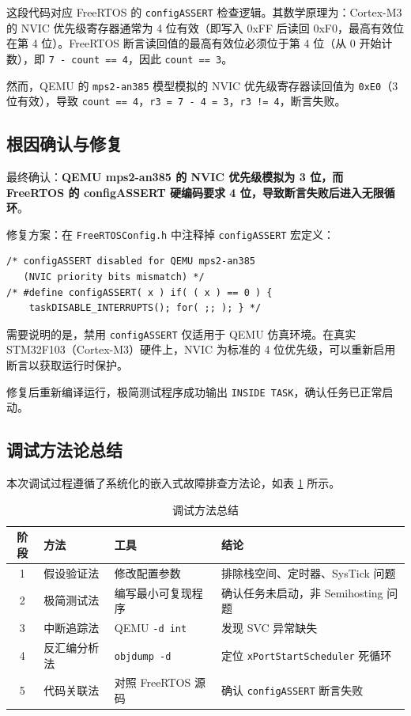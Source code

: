 \documentclass[12pt,a4paper]{ctexart}
\begin{document}
这段代码对应 FreeRTOS 的 \texttt{configASSERT} 检查逻辑。其数学原理为：Cortex-M3 的 NVIC 优先级寄存器通常为 4 位有效（即写入 0xFF 后读回 0xF0，最高有效位在第 4 位）。FreeRTOS 断言读回值的最高有效位必须位于第 4 位（从 0 开始计数），即 \texttt{7 - count == 4}，因此 \texttt{count == 3}。

然而，QEMU 的 \texttt{mps2-an385} 模型模拟的 NVIC 优先级寄存器读回值为 \texttt{0xE0}（3 位有效），导致 \texttt{count == 4}，\texttt{r3 = 7 - 4 = 3}，\texttt{r3 != 4}，断言失败。

\subsection{根因确认与修复}

最终确认：\textbf{QEMU mps2-an385 的 NVIC 优先级模拟为 3 位，而 FreeRTOS 的 configASSERT 硬编码要求 4 位，导致断言失败后进入无限循环}。

修复方案：在 \texttt{FreeRTOSConfig.h} 中注释掉 \texttt{configASSERT} 宏定义：

\begin{lstlisting}[caption={configASSERT 修复方案}]
/* configASSERT disabled for QEMU mps2-an385 
   (NVIC priority bits mismatch) */
/* #define configASSERT( x ) if( ( x ) == 0 ) { 
    taskDISABLE_INTERRUPTS(); for( ;; ); } */
\end{lstlisting}

需要说明的是，禁用 \texttt{configASSERT} 仅适用于 QEMU 仿真环境。在真实 STM32F103（Cortex-M3）硬件上，NVIC 为标准的 4 位优先级，可以重新启用断言以获取运行时保护。

修复后重新编译运行，极简测试程序成功输出 \texttt{INSIDE TASK}，确认任务已正常启动。

\subsection{调试方法论总结}

本次调试过程遵循了系统化的嵌入式故障排查方法论，如表 \ref{tab:debug-method} 所示。

\begin{table}[H]
\centering
\caption{调试方法总结}
\label{tab:debug-method}
\begin{tabular}{clll}
\toprule
\textbf{阶段} & \textbf{方法} & \textbf{工具} & \textbf{结论} \\
\midrule
1 & 假设验证法 & 修改配置参数 & 排除栈空间、定时器、SysTick 问题 \\
2 & 极简测试法 & 编写最小可复现程序 & 确认任务未启动，非 Semihosting 问题 \\
3 & 中断追踪法 & QEMU \texttt{-d int} & 发现 SVC 异常缺失 \\
4 & 反汇编分析法 & \texttt{objdump -d} & 定位 \texttt{xPortStartScheduler} 死循环 \\
5 & 代码关联法 & 对照 FreeRTOS 源码 & 确认 \texttt{configASSERT} 断言失败 \\
\bottomrule
\end{tabular}
\end{table}
\end{document}
